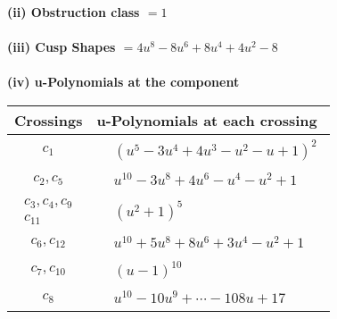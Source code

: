 \documentclass[1p]{elsarticle_modified}
\theoremstyle{definition}
\begin{document}
\flushleft \textbf{(ii) Obstruction class $= 1$}\\~\\
\flushleft \textbf{(iii) Cusp Shapes $= 4 u^8-8 u^6+8 u^4+4 u^2-8$}\\~\\
\newpage\renewcommand{\arraystretch}{1}
\flushleft \textbf{(iv) u-Polynomials at the component}\newline \\
\begin{tabular}{m{50pt}|m{274pt}}
Crossings & \hspace{64pt}u-Polynomials at each crossing \\
\hline $$\begin{aligned}c_{1}\end{aligned}$$&$\begin{aligned}
&(u^5-3 u^4+4 u^3- u^2- u+1)^2
\end{aligned}$\\
\hline $$\begin{aligned}c_{2},c_{5}\end{aligned}$$&$\begin{aligned}
&u^{10}-3 u^8+4 u^6- u^4- u^2+1
\end{aligned}$\\
\hline $$\begin{aligned}c_{3},c_{4},c_{9}\\c_{11}\end{aligned}$$&$\begin{aligned}
&(u^2+1)^5
\end{aligned}$\\
\hline $$\begin{aligned}c_{6},c_{12}\end{aligned}$$&$\begin{aligned}
&u^{10}+5 u^8+8 u^6+3 u^4- u^2+1
\end{aligned}$\\
\hline $$\begin{aligned}c_{7},c_{10}\end{aligned}$$&$\begin{aligned}
&(u-1)^{10}
\end{aligned}$\\
\hline $$\begin{aligned}c_{8}\end{aligned}$$&$\begin{aligned}
&u^{10}-10 u^9+\cdots-108 u+17
\end{aligned}$\\
\hline
\end{tabular}\\~\\
\end{document}
